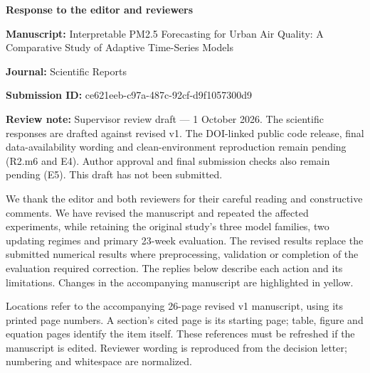 \documentclass[11pt,a4paper]{article}
\newcommand{\reviewnote}[1]{\par\noindent\colorbox{yellow!25}{\parbox{\dimexpr\linewidth-2\fboxsep\relax}{\small\textbf{Review note:} #1}}\par}
\begin{document}
\begin{center}\Large\bfseries Response to the editor and reviewers\end{center}
\textbf{Manuscript:} Interpretable PM2.5 Forecasting for Urban Air Quality: A Comparative Study of Adaptive Time-Series Models\par
\textbf{Journal:} Scientific Reports\par
\textbf{Submission ID:} ce621eeb-c97a-487c-92cf-d9f1057300d9\par
\reviewnote{Supervisor review draft --- 1 October 2026. The scientific responses are drafted against revised v1. The DOI-linked public code release, final data-availability wording and clean-environment reproduction remain pending (R2.m6 and E4). Author approval and final submission checks also remain pending (E5). This draft has not been submitted.}
We thank the editor and both reviewers for their careful reading and constructive comments. We have revised the manuscript and repeated the affected experiments, while retaining the original study's three model families, two updating regimes and primary 23-week evaluation. The revised results replace the submitted numerical results where preprocessing, validation or completion of the evaluation required correction. The replies below describe each action and its limitations. Changes in the accompanying manuscript are highlighted in yellow.

Locations refer to the accompanying 26-page revised v1 manuscript, using its printed page numbers. A section's cited page is its starting page; table, figure and equation pages identify the item itself. These references must be refreshed if the manuscript is edited. Reviewer wording is reproduced from the decision letter; numbering and whitespace are normalized.

\clearpage
\end{document}
